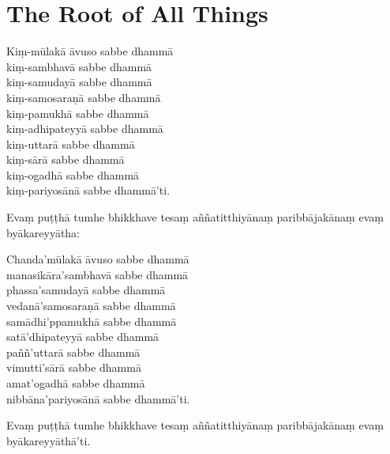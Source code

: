 \chapter{The Root of All Things}



\begin{leader}
\end{leader}

\enlargethispage{2\baselineskip}

Kiṃ-mūlakā āvuso sabbe dhammā\\
kiṃ-sambhavā sabbe dhammā\\
kiṃ-samudayā sabbe dhammā\\
kiṃ-samosaraṇā sabbe dhammā\\
kiṃ-pamukhā sabbe dhammā\\
kiṃ-adhipateyyā sabbe dhammā\\
kiṃ-uttarā sabbe dhammā\\
kiṃ-sārā sabbe dhammā\\
kiṃ-ogadhā sabbe dhammā\\
kiṃ-pariyosānā sabbe dhammā'ti.

Evaṃ puṭṭhā tumhe bhikkhave tesaṃ aññatitthiyānaṃ paribbājakānaṃ evaṃ byākareyyātha:

Chanda'mūlakā āvuso sabbe dhammā\\
manasikāra'sambhavā sabbe dhammā\\
phassa'samudayā sabbe dhammā\\
vedanā'samosaraṇā sabbe dhammā\\
samādhi'ppamukhā sabbe dhammā\\
satā'dhipateyyā sabbe dhammā\\
paññ'uttarā sabbe dhammā\\
vimutti'sārā sabbe dhammā\\
amat'ogadhā sabbe dhammā\\
nibbāna'pariyosānā sabbe dhammā'ti.

Evaṃ puṭṭhā tumhe bhikkhave tesaṃ aññatitthiyānaṃ paribbājakānaṃ evaṃ byākareyyāthā'ti.

